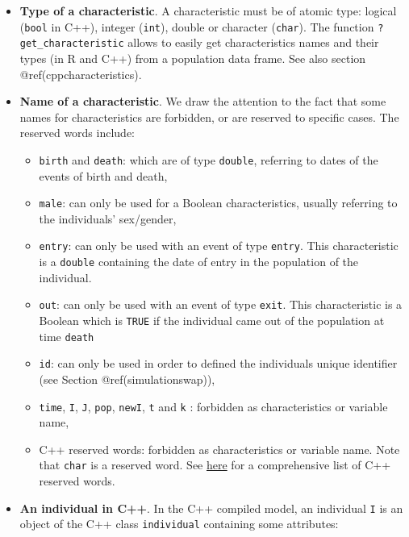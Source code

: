 \begin{Shaded}
\begin{Highlighting}[]
\end{Highlighting}
\end{Shaded}

\begin{itemize}
\item
  \textbf{Type of a characteristic}.
  A characteristic must be of atomic type: logical (\texttt{bool} in C++), integer (\texttt{int}), double or character (\texttt{char}). The function \texttt{?get\_characteristic} allows to easily get characteristics names and their types (in R and C++) from a population data frame. See also section @ref(cppcharacteristics).
\item
  \textbf{Name of a characteristic}.
  We draw the attention to the fact that some names for characteristics are forbidden, or are reserved to specific cases. The reserved words include:

  \begin{itemize}
  \tightlist
  \item
    \texttt{birth} and \texttt{death}: which are of type \texttt{double}, referring to dates of the events of birth and death,
  \item
    \texttt{male}: can only be used for a Boolean characteristics, usually referring to the individuals' sex/gender,
  \item
    \texttt{entry}: can only be used with an event of type \texttt{entry}. This characteristic is a \texttt{double} containing the date of entry in the population of the individual.
  \item
    \texttt{out}: can only be used with an event of type \texttt{exit}. This characteristic is a Boolean which is \texttt{TRUE} if the individual came out of the population at time \texttt{death}
  \item
    \texttt{id}: can only be used in order to defined the individuals unique identifier (see Section @ref(simulationswap)),
  \item
    \texttt{time}, \texttt{I}, \texttt{J}, \texttt{pop}, \texttt{newI}, \texttt{t} and \texttt{k} : forbidden as characteristics or variable name,
  \item
    C++ reserved words: forbidden as characteristics or variable name. Note that \texttt{char}
    is a reserved word. See \href{https://en.cppreference.com/w/cpp/keyword}{here} for a comprehensive list of C++ reserved words.
  \end{itemize}
\item
  \textbf{An individual in C++}.
  In the C++ compiled model, an individual \texttt{I} is an object of the C++ class \texttt{individual} containing some attributes:


\end{itemize}
